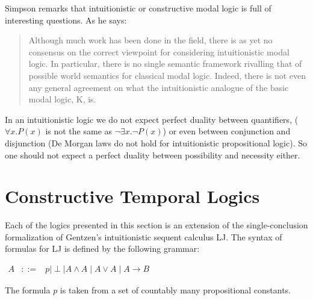 \documentclass{article}
\begin{document}
 Simpson remarks that intuitionistic or constructive modal logic is full of interesting questions. As he says:
\begin{quote}
Although much work has been done in the field, there is as yet no consensus on the correct viewpoint for considering intuitionistic modal logic.  In particular, there is no single semantic framework rivalling that of possible world semantics for classical modal logic.
Indeed, there is not even any general agreement on what the
intuitionistic analogue of the basic modal logic, K, is.
\end{quote}
In an intuitionistic logic we do not expect perfect duality between
quantifiers, ($\forall x.P(x)$ is not the same as $\neg \exists x.\neg
P(x)$) or even between conjunction and disjunction (De Morgan laws do
not hold for intuitionistic propositional logic). So one should not
expect a perfect duality between possibility and necessity either.

\section{Constructive Temporal Logics}

Each of the logics presented in this section is an  extension of the single-conclusion formalization of Gentzen's  
intuitionistic sequent calculus LJ.  The syntax of formulas for LJ is defined by the following grammar:
\begin{center}
    \begin{math}
        \begin{array}{lllllllll}
            A & ::= & p \mid \perp \mid A \land A \mid A \lor A \mid A \to B
        \end{array}
    \end{math}
\end{center}
The formula $p$ is taken from a set of countably many propositional constants.
\end{document}
